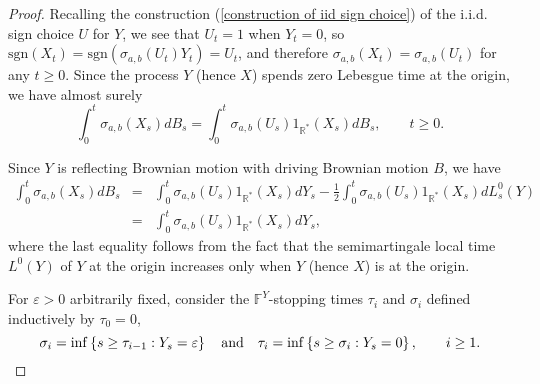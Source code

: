 \documentclass[reqno]{amsart}
\theoremstyle{definition}
\theoremstyle{remark}
\numberwithin{equation}{section}
\begin{document}
\begin{proof}
Recalling the construction (\ref{construction of iid sign choice}) of the i.i.d. sign choice $U$ for $Y$, we see that $U_t=1$ when $Y_t=0$, so $\mathrm{sgn}\left( X_{t}\right)= \mathrm{sgn}\left( \sigma _{a,b}\left( U_{t}\right) Y_{t} \right) =U_{t}$, and therefore $\sigma _{a,b}\left( X_{t}\right) =\sigma
_{a,b}\left( U_{t}\right)$ for any $t\geq 0$. Since the process $Y$ (hence $X$) spends zero Lebesgue time at the origin, we have
almost surely\begin{equation*}
\int_{0}^{t}\sigma _{a,b}\left( X_{s}\right) dB_{s}=\int_{0}^{t}\sigma
_{a,b}\left( U_{s}\right) 1_{\mathbb{R}^{\ast }}\left( X_{s}\right) dB_{s},\qquad t\ge 0.
\end{equation*}

Since $Y$ is reflecting Brownian motion with driving Brownian motion $B$, we have
\begin{eqnarray*}
\int_{0}^{t}\sigma _{a,b}\left( X_{s}\right) dB_{s} &=&\int_{0}^{t}\sigma
_{a,b}\left( U_{s}\right) 1_{\mathbb{R}^{\ast }}\left( X_{s}\right)
dY_{s}-\frac12\int_{0}^{t}\sigma _{a,b}\left( U_{s}\right) 1_{\mathbb{R}^{\ast }}\left(
X_{s}\right) dL_{s}^{0}\left( Y\right) \\
&=&\int_{0}^{t}\sigma _{a,b}\left( U_{s}\right) 1_{\mathbb{R}^{\ast }}\left(
X_{s}\right) dY_{s},
\end{eqnarray*}where the last equality follows from the fact that the semimartingale local time $L^{0}\left(
Y\right) $ of $Y$ at the origin increases only when $Y$ (hence $X$) is at the origin.

\label{pagina de start referinta}
For $\varepsilon >0$ arbitrarily fixed, consider the $\mathbb{F}^Y$-stopping times $\tau
_{i}$ and $\sigma _{i}$ defined inductively by $\tau _{0}=0$,\[
\sigma _{i}=\inf \left\{ s\geq \tau _{i-1}:Y_{s}=\varepsilon \right\} \quad
\text{and\quad }\tau _{i}=\inf \left\{ s\geq \sigma _{i}:Y_{s}=0\right\} ,\qquad
i\geq 1.
\]


\end{proof}
\end{document}

